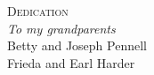 \cleardoublepage
{}
{}
\vspace*{200pt}
\begingroup
\begin{center}
\large\textsc{Dedication}\\
\bigskip
\textit{To my grandparents}\\
Betty and Joseph Pennell\\
Frieda and Earl Harder
\end{center}
\endgroup
\vspace*{\fill}
